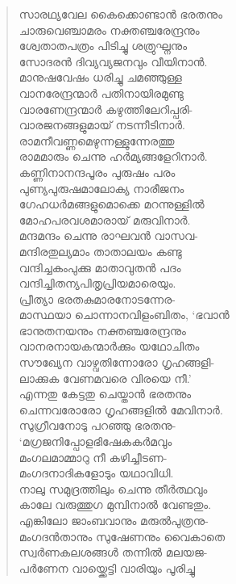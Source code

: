 \begin{verse}
സാരഥ്യവേല കൈക്കൊണ്ടാന്‍ ഭരതനും\\
ചാരുവെഞ്ചാമരം നക്തഞ്ചരേന്ദ്രനും\\
ശ്വേതാതപത്രം പിടിച്ചു ശത്രുഘ്നനും\\
സോദരന്‍ ദിവ്യവ്യജനവും വീയിനാന്‍.\\
മാനുഷവേഷം ധരിച്ചു ചമഞ്ഞുള്ള\\
വാനരേന്ദ്രന്മാര്‍ പതിനായിരമുണ്ടു\\
വാരണേന്ദ്രന്മാര്‍ കഴുത്തിലേറിപ്പരി-\\
വാരജനങ്ങളുമായ് നടന്നീടിനാര്‍.\\
രാമനീവണ്ണമെഴുന്നള്ളുന്നേരത്തു\\
രാമമാരും ചെന്നു ഹര്‍മ്യങ്ങളേറിനാര്‍.\\
കണ്ണിനാനന്ദപൂരം പുരുഷം പരം\\
പുണ്യപുരുഷമാലോക്യ നാരീജനം\\
ഗേഹധര്‍മങ്ങളുമൊക്കെ മറന്നുള്ളില്‍\\
മോഹപരവശമാരായ് മരുവിനാര്‍.\\
മന്ദമന്ദം ചെന്നു രാഘവന്‍ വാസവ-\\
മന്ദിരതുല്യമാം താതാലയം കണ്ടു\\
വന്ദിച്ചകംപുക്കു മാതാവുതന്‍ പദം\\
വന്ദിച്ചിതന്യപിതൃപ്രിയമാരെയും.\\
പ്രീത്യാ ഭരതകുമാരനോടന്നേര-\\
മാസ്ഥയാ ചൊന്നാനവിളംബിതം, ‘ഭവാന്‍\\
ഭാനുതനയനും നക്തഞ്ചരേന്ദ്രനും\\
വാനരനായകന്മാര്‍ക്കും യഥോചിതം\\
സൗഖ്യേന വാഴ്വതിന്നോരോ ഗൃഹങ്ങളി-\\
ലാക്കുക വേണമവരെ വിരയെ നീ.’\\
എന്നതു കേട്ടതു ചെയ്താന്‍ ഭരതനും\\
ചെന്നവരോരോ ഗൃഹങ്ങളില്‍ മേവിനാര്‍.\\
സുഗ്രീവനോടു പറഞ്ഞു ഭരതനു-\\
‘മഗ്രജനിപ്പോളഭിഷേകകര്‍മവും\\
മംഗലമാമ്മാറു നീ കഴിച്ചീടണ-\\
മംഗദനാദികളോടും യഥാവിധി.\\
നാലു സമുദ്രത്തിലും ചെന്നു തീര്‍ത്ഥവും\\
കാലേ വരുത്തുഗ മുമ്പിനാല്‍ വേണ്ടതും.\\
എങ്കിലോ ജാംബവാനും മരുല്‍പുത്രനു-\\
മംഗദന്‍താനും സുഷേണനും വൈകാതെ\\
സ്വര്‍ണകലശങ്ങള്‍ തന്നില്‍ മലയജ-\\
പര്‍ണേന വായ്ക്കെട്ടി വാരിയും പൂരിച്ചു\\

\end{verse}
